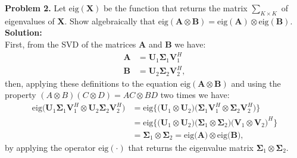 \documentclass[12pt]{article}
\begin{document}
\noindent
\textbf{Problem 2.} Let $\text{eig} (\bm{X})$ be the function that returns the 
matrix $\sum_{K\times K}$ of eigenvalues of $\bm{X}$. Show algebraically that 
$\text{eig}(\bm{A}\otimes\bm{B}) = 
\text{eig}(\bm{A})\otimes\text{eig}(\bm{B})$.\\

\noindent \textbf{Solution:}\\

First, from the SVD of the matrices $\bm{A}$ and $\bm{B}$ we have:
\begin{align*}
    \bm{A} &= \bm{U}_1 \bm{\Sigma}_1 \bm{V}_{1}^{H}\\
    \bm{B} &= \bm{U}_2 \bm{\Sigma}_2 \bm{V}_{2}^{H},
\end{align*}
then, applying these definitions to the equation 
$\text{eig}(\bm{A}\otimes\bm{B})$ and using the property 
$(A\otimes B)(C\otimes D) = AC\otimes BD$ two times we have:
\begin{align*}
    \text{eig}\big(\bm{U}_1 \bm{\Sigma}_1 \bm{V}_{1}^{H}\otimes 
    \bm{U}_2 \bm{\Sigma}_2 \bm{V}_{2}^{H}\big) &=
    \text{eig}\big\{ \big( \bm{U}_1 \otimes \bm{U}_2 \big)
    \big( \bm{\Sigma}_1 \bm{V}_{1}^{H} \otimes \bm{\Sigma}_2 \bm{V}_{2}^{H}\big)
    \big\}\\
        &= \text{eig}\big\{ \big( \bm{U}_1 \otimes \bm{U}_2 \big)
        \big( \bm{\Sigma}_1 \otimes \bm{\Sigma}_2 \big)
        \big( \bm{V}_{1} \otimes \bm{V}_{2}\big)^{H}\big\}\\
        &= \bm{\Sigma}_1 \otimes \bm{\Sigma}_2 = 
        \text{eig}\big( \bm{A}\big) \otimes \text{eig}\big( \bm{B} \big),
\end{align*} by applying the operator $\text{eig}(\cdot)$ that returns the 
eigenvalue matrix $\bm{\Sigma}_1 \otimes \bm{\Sigma}_2$. 

\end{document}
